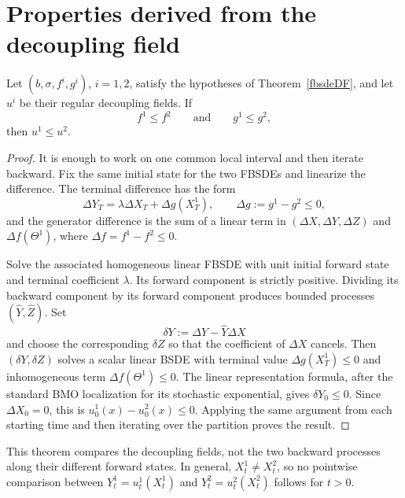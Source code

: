 \section{Properties derived from the decoupling field}

\begin{thm}
Let $(b,\sigma,f^i,g^i)$, $i=1,2$, satisfy the hypotheses of
Theorem~\ref{fbsdeDF}, and let $u^i$ be their regular decoupling fields.
If
\[
  f^1\le f^2
  \qquad\text{and}\qquad
  g^1\le g^2,
\]
then $u^1\le u^2$.
\end{thm}

\begin{proof}
It is enough to work on one common local interval and then iterate
backward.  Fix the same initial state for the two FBSDEs and linearize
the difference.  The terminal difference has the form
\[
  \Delta Y_T=\lambda\Delta X_T+\Delta g(X_T^1),
  \qquad \Delta g:=g^1-g^2\le0,
\]
and the generator difference is the sum of a linear term in
$(\Delta X,\Delta Y,\Delta Z)$ and
$\Delta f(\Theta^1)$, where $\Delta f=f^1-f^2\le0$.

Solve the associated homogeneous linear FBSDE with unit initial forward
state and terminal coefficient $\lambda$.  Its forward component is
strictly positive.  Dividing its backward component by its forward
component produces bounded processes $(\widehat Y,\widehat Z)$.  Set
\[
  \delta Y:=\Delta Y-\widehat Y\Delta X
\]
and choose the corresponding $\delta Z$ so that the coefficient of
$\Delta X$ cancels.  Then $(\delta Y,\delta Z)$ solves a scalar linear
BSDE with terminal value $\Delta g(X_T^1)\le0$ and inhomogeneous term
$\Delta f(\Theta^1)\le0$.  The linear representation formula, after the
standard BMO localization for its stochastic exponential, gives
$\delta Y_0\le0$.  Since $\Delta X_0=0$, this is
$u_0^1(x)-u_0^2(x)\le0$.  Applying the same argument from each starting
time and then iterating over the partition proves the result.
\end{proof}

\begin{remark}
This theorem compares the decoupling fields, not the two backward
processes along their different forward states.  In general,
$X_t^1\ne X_t^2$, so no pointwise comparison between
$Y_t^1=u_t^1(X_t^1)$ and $Y_t^2=u_t^2(X_t^2)$ follows for $t>0$.
\end{remark}

